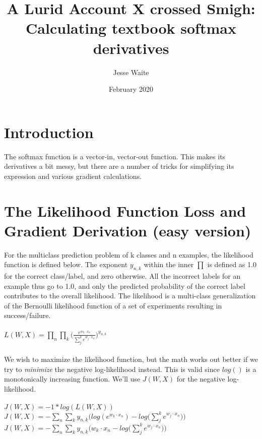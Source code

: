 \documentclass{article}
\title{A Lurid Account X crossed Smigh: \\ Calculating textbook softmax derivatives}
\author{Jesse Waite}
\date{February 2020}
\begin{document}
\maketitle

\section{Introduction}
The softmax function is a vector-in, vector-out function. This makes its derivatives a bit messy, but there are a number of tricks for simplifying its expression and various gradient calculations.

\section{The Likelihood Function Loss and Gradient Derivation (easy version)}

For the multiclass prediction problem of k classes and n examples, the likelihood function is defined below. The exponent $y_{n,k}$ within the inner $\prod $ is defined as 1.0 for the correct class/label, and zero otherwise. All the incorrect labels for an example thus go to 1.0, and only the predicted probability of the correct label contributes to the overall likelihood. The likelihood is a multi-class generalization of the Bernoulli likelihood function of a set of experiments resulting in success/failure. \\ \\

$L(W,X) = \prod_{n} \prod_{k} \Big(\frac{e^{w_{k} \cdot x_{n}}}{\sum_{j}^{k} e^{w_{j} \cdot x_{n}}}\Big)^{y_{n,k}}$ 
\\ \\

We wish to maximize the likelihood function, but the math works out better if we try to \textit{minimize} the negative log-likelihood instead. This is valid since $log()$ is a monotonically increasing function. We'll use $J(W,X)$ for the negative log-likelihood.
\\ \\

$J(W,X) = -1 * log(L(W,X)) $ \\

$J(W,X) = - \sum_{n} \sum_{k} y_{n,k}\Big(log(e^{w_{k} \cdot x_{n}}) - log\big(\sum_{j}^{k} e^{w_{j} \cdot x_{n}}\big)\Big)$  \\

$J(W,X) = - \sum_{n} \sum_{k} y_{n,k}\Big(w_{k} \cdot x_{n} - log\big(\sum_{j}^{k} e^{w_{j} \cdot x_{n}}\big)\Big)$ \\
\end{document}
